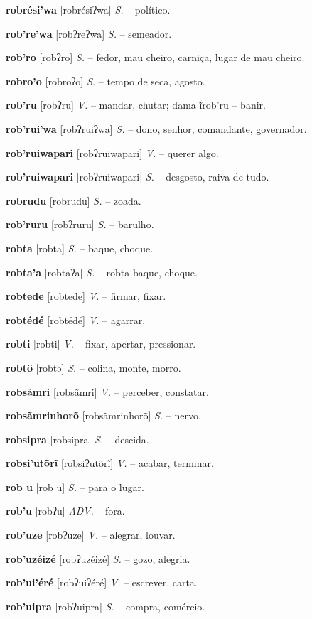 \textbf{robrési'wa} [robrésiʔwa] \textit{S.} -- político.

\textbf{rob're'wa} [robʔreʔwa] \textit{S.} -- semeador.

\textbf{rob'ro} [robʔro] \textit{S.} -- fedor, mau cheiro, carniça, lugar de mau cheiro.

\textbf{robro'o} [robroʔo] \textit{S.} -- tempo de seca, agosto.

\textbf{rob'ru} [robʔru] \textit{V.} -- mandar, chutar; dama ĩrob'ru -- banir.

\textbf{rob'rui'wa} [robʔruiʔwa] \textit{S.} -- dono, senhor, comandante, governador.

\textbf{rob'ruiwapari} [robʔruiwapari] \textit{V.} -- querer algo.

\textbf{rob'ruiwapari} [robʔruiwapari] \textit{S.} -- desgosto, raiva de tudo.

\textbf{robrudu} [robrudu] \textit{S.} -- zoada.

\textbf{rob'ruru} [robʔruru] \textit{S.} -- barulho.

\textbf{robta} [robta] \textit{S.} -- baque, choque.

\textbf{robta'a} [robtaʔa] \textit{S.} -- robta baque, choque.

\textbf{robtede} [robtede] \textit{V.} -- firmar, fixar.

\textbf{robtédé} [robtédé] \textit{V.} -- agarrar.

\textbf{robti} [robti] \textit{V.} -- fixar, apertar, pressionar.

\textbf{robtö} [robtə] \textit{S.} -- colina, monte, morro.

\textbf{robsãmri} [robsãmri] \textit{V.} -- perceber, constatar.

\textbf{robsãmrinhorõ} [robsãmrinhorõ] \textit{S.} -- nervo.

\textbf{robsipra} [robsipra] \textit{S.} -- descida.

\textbf{robsi'utõrĩ} [robsiʔutõrĩ] \textit{V.} -- acabar, terminar.

\textbf{rob u} [rob u] \textit{S.} -- para o lugar.

\textbf{rob'u} [robʔu] \textit{ADV.} -- fora.

\textbf{rob'uze} [robʔuze] \textit{V.} -- alegrar, louvar.

\textbf{rob'uzéizé} [robʔuzéizé] \textit{S.} -- gozo, alegria.

\textbf{rob'ui'éré} [robʔuiʔéré] \textit{V.} -- escrever, carta.

\textbf{rob'uipra} [robʔuipra] \textit{S.} -- compra, comércio.

